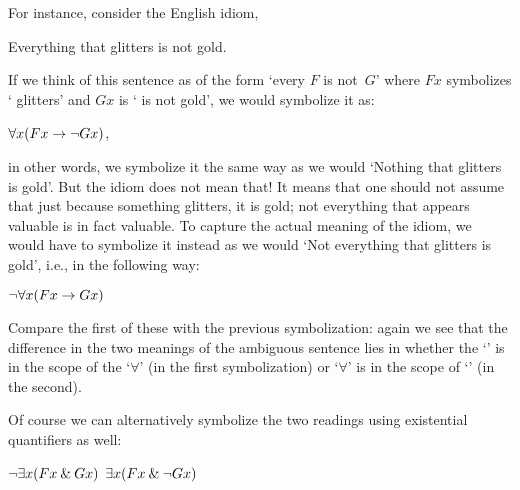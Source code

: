 For instance, consider the English idiom,
\begin{earg}
	\item[\ex{glitters}]
	Everything that glitters is not gold.
\end{earg}
If we think of this sentence as of the form `every $F$ is not~$G$' where $F{x}$ symbolizes ` glitters' and ${G}{x}$ is ` is not gold', we would symbolize it as:
\begin{earg}
	\prem $\forall x(F{x} \rightarrow \neg {G}{x})$,
\end{earg}
in other words, we symbolize it the same way as we would `Nothing that glitters is gold'. But the idiom does not mean that! It means that one should not assume that just because something glitters, it is gold; not everything that appears valuable is in fact valuable.  To capture the actual meaning of the idiom, we would have to symbolize it instead as we would `Not everything that glitters is gold', i.e., in the following way:
\begin{earg}
	\prem $\neg\forall x(F{x} \rightarrow {G}{x})$
\end{earg}
Compare the first of these with the previous symbolization: again we see that the difference in the two meanings of the ambiguous sentence lies in whether the `\enot' is in the scope of the `$\forall$' (in the first symbolization) or `$\forall$' is in the scope of `\enot' (in the second).

Of course we can alternatively symbolize the two readings using existential quantifiers as well:
\begin{earg}
	\prem $\neg\exists x(F{x} \mathbin{\&} {G}{x})$
	\prem $\exists x(F{x} \mathbin{\&} \neg {G}{x})$
\end{earg}

